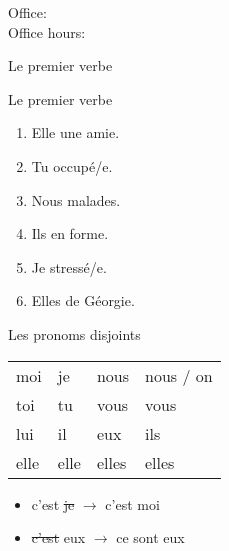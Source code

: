 \documentclass{beamer}
\subtitle[Présentons-nous]{Présentons-nous}
\begin{document}
  \begin{frame}
    \titlepage
    \tiny{Office: \\
          Office hours: }
  \end{frame}

  \begin{frame}{Le premier verbe }
    \begin{center}
      
    \end{center}
  \end{frame}

  \begin{frame}{Le premier verbe }
    \begin{enumerate}
      \item Elle \underline{} une amie.
      \item Tu \underline{} occupé/e.
      \item Nous \underline{} malades.
      \item Ils \underline{} en forme.
      \item Je \underline{} stressé/e.
      \item Elles \underline{} de Géorgie.
    \end{enumerate}
  \end{frame}

  \begin{frame}{Les pronoms disjoints}
    \begin{center}
      \begin{tabular}{l l l l}
        \alert{moi}  & je   & \alert{nous}  & nous / on \\
        \alert{toi}  & tu   & \alert{vous}  & vous \\
        \alert{lui}  & il   & \alert{eux}   & ils \\
        \alert{elle} & elle & \alert{elles} & elles \\
      \end{tabular}
    \end{center}
    \begin{itemize}
      \item c'est \sout{je} $\to$ c'est \alert{moi}
      \item \sout{c'est} eux $\to$ \alert{ce sont} eux
    \end{itemize}
  \end{frame}
\end{document}
